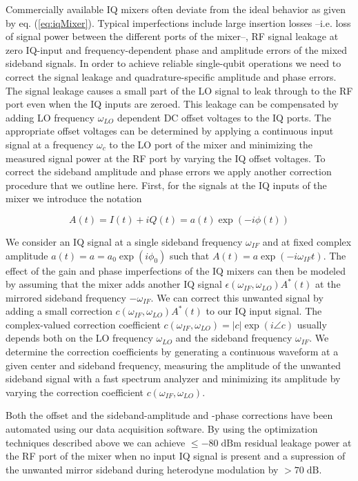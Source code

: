 Commercially available IQ mixers often deviate from the ideal behavior as given by eq. (\ref{eq:iqMixer}). Typical imperfections include large insertion losses --i.e. loss of signal power between the different ports of the mixer--, RF signal leakage at zero IQ-input and frequency-dependent phase and amplitude errors of the mixed sideband signals. In order to achieve reliable single-qubit operations we need to correct the signal leakage and quadrature-specific amplitude and phase errors. The signal leakage causes a small part of the LO signal to leak through to the RF port even when the IQ inputs are zeroed. This leakage can be compensated by adding LO frequency $\omega_{LO}$ dependent DC offset voltages to the IQ ports. The appropriate offset voltages can be determined by applying a continuous input signal at a frequency $\omega_c$ to the LO port of the mixer and minimizing the measured signal power at the RF port by varying the IQ offset voltages. To correct the sideband amplitude and phase errors we apply another correction procedure that we outline here. First, for the signals at the IQ inputs of the mixer we introduce the notation

\begin{equation}
A(t) = I(t)+iQ(t) = a(t)\exp{(-i\phi(t))} \label{eq:iq_if_input}
\end{equation}

We consider an IQ signal at a single sideband frequency $\omega_{IF}$ and at fixed complex amplitude $a(t) = a = a_0\exp{(i\phi_0)}$ such that $A(t) = a\exp{(-i \omega_{IF} t)}$. The effect of the gain and phase imperfections of the IQ mixers can then be modeled by assuming that the mixer adds another IQ signal $\epsilon(\omega_{IF},\omega_{LO})A^*(t)$ at the mirrored sideband frequency $-\omega_{IF}$. We can correct this unwanted signal by adding a small correction $c(\omega_{IF},\omega_{LO})A^*(t)$ to our IQ input signal. The complex-valued correction coefficient $c(\omega_{IF},\omega_{LO})=|c|\exp{(i\angle c)}$ usually depends both on the LO frequency $\omega_{LO}$ and the sideband frequency $\omega_{IF}$. We determine the correction coefficients by generating a continuous waveform at a given center and sideband frequency, measuring the amplitude of the unwanted sideband signal with a fast spectrum analyzer and minimizing its amplitude by varying the correction coefficient $c(\omega_{IF},\omega_{LO})$.

Both the offset and the sideband-amplitude and -phase corrections have been automated using our data acquisition software. By using the optimization techniques described above we can achieve $\le-80\;\mathrm{dBm}$ residual leakage power at the RF port of the mixer when no input IQ signal is present and a supression of the unwanted mirror sideband during heterodyne modulation by $>70\;\mathrm{dB}$.

